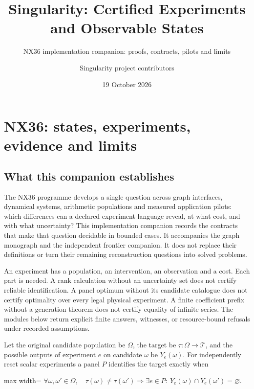 \documentclass[
  11pt,
  a4paper,
]{report}
\title{Singularity: Certified Experiments and Observable States}
\subtitle{NX36 implementation companion: proofs, contracts, pilots and
limits}
\author{Singularity project contributors}
\date{19 October 2026}
\begin{document}
\maketitle

{
\setcounter{tocdepth}{1}
\tableofcontents
}
\hypertarget{nx36-states-experiments-evidence-and-limits}{%
\chapter{NX36: states, experiments, evidence and
limits}\label{nx36-states-experiments-evidence-and-limits}}

\hypertarget{what-this-companion-establishes}{%
\section{What this companion
establishes}\label{what-this-companion-establishes}}

The NX36 programme develops a single question across graph interfaces,
dynamical systems, arithmetic populations and measured application
pilots: which differences can a declared experiment language reveal, at
what cost, and with what uncertainty? This implementation companion
records the contracts that make that question decidable in bounded
cases. It accompanies the graph monograph and the independent frontier
companion. It does not replace their definitions or turn their remaining
reconstruction questions into solved problems.

An experiment has a population, an intervention, an observation and a
cost. Each part is needed. A rank calculation without an uncertainty set
does not certify reliable identification. A panel optimum without its
candidate catalogue does not certify optimality over every legal
physical experiment. A finite coefficient prefix without a generation
theorem does not certify equality of infinite series. The modules below
return explicit finite answers, witnesses, or resource-bound refusals
under recorded assumptions.

Let the original candidate population be \(\Omega\), the target be
\(\tau:\Omega\to\mathcal T\), and the possible outputs of experiment
\(e\) on candidate \(\omega\) be \(Y_e(\omega)\). For independently
reset scalar experiments a panel \(P\) identifies the target exactly
when

\begin{center}
\begin{adjustbox}{max width=\linewidth}
$\displaystyle
\forall\omega,\omega'\in\Omega,\quad
\tau(\omega)\ne\tau(\omega')
\Longrightarrow
\exists e\in P:\ Y_e(\omega)\cap Y_e(\omega')=\varnothing.
$
\end{adjustbox}
\end{center}
\end{document}
